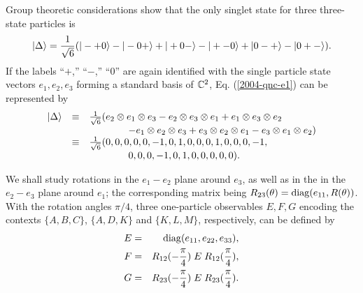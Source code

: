 \documentclass[12pt]{iopart}
\begin{document}
Group theoretic considerations \cite{2004-kasper-svo,kok-02}
show that the only singlet state for three three-state particles is
\begin{equation}
\vert \Delta \rangle
= {1\over \sqrt{6}}(
\vert - + 0\rangle
-
\vert - 0 +\rangle
+
\vert + 0 - \rangle
-
\vert + - 0\rangle
+
\vert 0 - + \rangle
-
\vert 0 + - \rangle
).
\label{2004-qnc-e1}
\end{equation}
If the labels
``$+$,''
``$-$,''
``$0$''
are again identified with the single particle state vectors
$e_1,e_2,e_3$ forming a standard basis of ${\Bbb C}^2$,
Eq. (\ref{2004-qnc-e1}) can be represented by
\begin{equation}
\begin{array}{ccl}
\vert \Delta \rangle
&\equiv& {1\over \sqrt{6}}(
 e_2 \otimes e_1 \otimes  e_3
-
 e_2 \otimes  e_3 \otimes  e_1
+
 e_1 \otimes  e_3 \otimes  e_2 \\
&&
\qquad
\qquad
-
 e_1 \otimes  e_2 \otimes  e_3
+
 e_3  \otimes e_2  \otimes e_1
-
 e_3 \otimes  e_1 \otimes  e_2
)
\\
&\equiv&
{1\over \sqrt{6}}
(0, 0, 0, 0, 0, -1, 0, 1, 0, 0, 0, 1, 0, 0, 0, -1, \\
&&
\qquad
\qquad
0, 0, 0, -1, 0, 1, 0, 0, 0, 0, 0)
.
\end{array}
\label{2004-qnc-e1r}
\end{equation}



We shall study rotations in the $e_1-e_2$ plane around $e_3$,
 as well as in the in the $e_2-e_3$ plane around $e_1$; the corresponding matrix
being
$
R_{23}(\theta ) =  {\rm diag}(e_{11},R(\theta ))
$.
With the rotation angles $\pi /4$,
three one-particle observables $E,F,G$ encoding the contexts
$\{A,B,C\}$,
$\{A,D,K\}$ and
$\{K,L,M\}$, respectively,
can be defined by
\begin{eqnarray}
E &=&
{\rm diag}(e_{11},e_{22},e_{33}),
\label{2004-analog-Epiover43p1}
\\
F &=& R_{12}(-{\pi \over 4})\; E \; R_{12}({\pi \over 4})
,
\\
G &=& R_{23}(-{\pi \over 4})\; E \; R_{23}({\pi \over 4})
.
\label{2004-analog-Epiover4b3p1}
\end{eqnarray}
\end{document}
